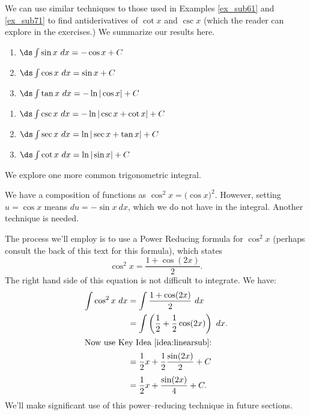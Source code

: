 We can use similar techniques to those used in Examples \ref{ex_sub61} and \ref{ex_sub71} to find antiderivatives of $\cot x$ and $\csc x$ (which the reader can explore in the exercises.) We summarize our results here.

{\begin{minipage}{.45\specialboxlength}\small{}
	\begin{enumerate}
	\item		$\ds \int \sin x \ dx = -\cos x +C$
	\item		$\ds\int \cos x\ dx = \sin x + C$
	\item		$\ds \int \tan x\ dx = -\ln|\cos x|+C$
\end{enumerate}
\end{minipage}
\begin{minipage}{.55\specialboxlength}\small
	\begin{enumerate}\addtocounter{enumi}{3}
	\item		$\ds \int \csc x \ dx = -\ln|\csc x+\cot x| +C$
	\item		$\ds\int \sec x\ dx = \ln|\sec x+\tan x| + C$
	\item		$\ds \int \cot x\ dx = \ln|\sin x|+C$
\end{enumerate}
\end{minipage}
}

We explore one more common trigonometric integral.\\

{We have a composition of functions as $\cos^2x = \big(\cos x\big)^2$. 
However, setting $u = \cos x$ means $du = -\sin x\ dx$, which we do not have in the integral. Another technique is needed.

The process we'll employ is to use a Power Reducing formula for $\cos^2x$ (perhaps consult the back of this text for this formula), which states 
	$$\cos ^2x = \frac{1+\cos(2x)}{2}.$$
	The right hand side of this equation is not difficult to integrate. We have:
\begin{align*}
	\int \cos^2x\ dx &= \int \frac{1+\cos(2x)}2\ dx \\
									&=	\int \left( \frac12 + \frac12\cos(2x)\right)\ dx. \\
\intertext{Now use Key Idea \ref{idea:linearsub}:}
									&= \frac12x + \frac12\frac{\sin(2x)}{2} + C \rule[-10pt]{0pt}{5pt}\\
									&= \frac12x + \frac{\sin(2x)}4 + C.
\end{align*}
We'll make significant use of this power--reducing technique in future sections.
}\\
\pagebreak

